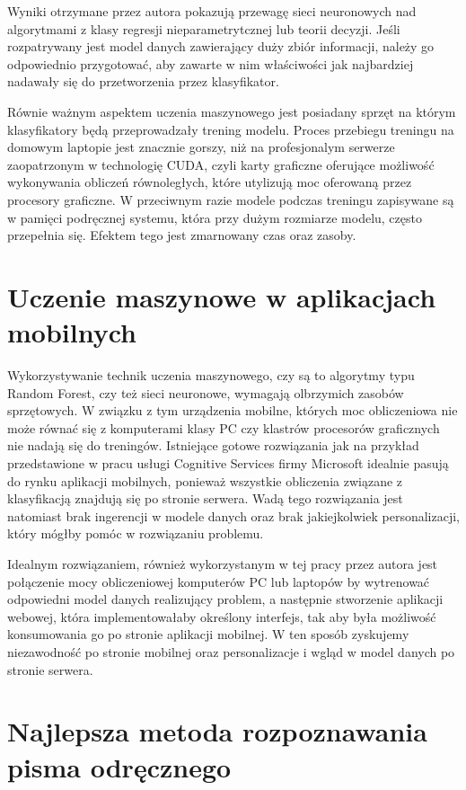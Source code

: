\documentclass[brudnopis]{xmgr}
\begin{document}
Wyniki otrzymane przez autora pokazują przewagę sieci neuronowych nad algorytmami z klasy regresji nieparametrytcznej lub teorii decyzji. Jeśli rozpatrywany jest model danych zawierający duży zbiór informacji, należy go odpowiednio przygotować, aby zawarte w nim właściwości jak najbardziej nadawały się do przetworzenia przez klasyfikator. 

Równie ważnym aspektem uczenia maszynowego jest posiadany sprzęt na którym klasyfikatory będą przeprowadzały trening modelu. Proces przebiegu treningu na domowym laptopie jest znacznie gorszy, niż na profesjonalym serwerze zaopatrzonym w technologię CUDA, czyli karty graficzne oferujące możliwość wykonywania obliczeń równoległych, które utylizują moc oferowaną przez procesory graficzne. W przeciwnym razie modele podczas treningu zapisywane są w pamięci podręcznej systemu, która przy dużym rozmiarze modelu, często przepełnia się. Efektem tego jest zmarnowany czas oraz zasoby.

\section{Uczenie maszynowe w aplikacjach mobilnych}

Wykorzystywanie technik uczenia maszynowego, czy są to algorytmy typu Random Forest, czy też sieci neuronowe, wymagają olbrzymich zasobów sprzętowych. W związku z tym urządzenia mobilne, których moc obliczeniowa nie może równać się z komputerami klasy PC czy klastrów procesorów graficznych nie nadają się do treningów. Istniejące gotowe rozwiązania jak na przykład przedstawione w pracu usługi Cognitive Services firmy Microsoft idealnie pasują do rynku aplikacji mobilnych, ponieważ wszystkie obliczenia związane z klasyfikacją znajdują się po stronie serwera. Wadą tego rozwiązania jest natomiast brak ingerencji w modele danych oraz brak jakiejkolwiek personalizacji, który mógłby pomóc w rozwiązaniu problemu.

Idealnym rozwiązaniem, również wykorzystanym w tej pracy przez autora jest połączenie mocy obliczeniowej komputerów PC lub laptopów by wytrenować odpowiedni model danych realizujący problem, a następnie stworzenie aplikacji webowej, która implementowałaby określony interfejs, tak aby była możliwość konsumowania go po stronie aplikacji mobilnej. W ten sposób zyskujemy niezawodność po stronie mobilnej oraz personalizacje i wgląd w model danych po stronie serwera.

\section{Najlepsza metoda rozpoznawania pisma odręcznego}
\end{document}
